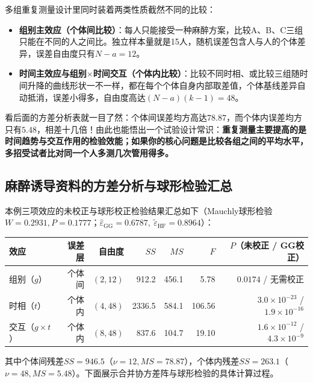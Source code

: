 \begin{sikao}[为什么多组重复测量有两个误差项？]
多组重复测量设计里同时装着两类性质截然不同的比较：
\begin{itemize}
\item \textbf{组别主效应（个体间比较）}：每人只能接受一种麻醉方案，比较A、B、C三组只能在不同的人之间比。独立样本量就是15人，随机误差包含人与人的个体差异，误差自由度只有$N-a=12$。
\item \textbf{时间主效应与组别$\times$时间交互（个体内比较）}：比较不同时相、或比较三组随时间升降的曲线形状一不一样，都在每个个体自身内部取差值，个体基线差异自动抵消，误差小得多，自由度高达$(N-a)(k-1)=48$。
\end{itemize}
看后面的方差分析表就一目了然：个体间误差均方高达$78.87$，而个体内误差均方只有$5.48$，相差十几倍！由此也能悟出一个试验设计常识：\textbf{重复测量主要提高的是时间趋势与交互作用的检验效能；如果你的核心问题是比较各组之间的平均水平，多招受试者比对同一个人多测几次管用得多。}
\end{sikao}

\subsection{麻醉诱导资料的方差分析与球形检验汇总}
本例三项效应的未校正与球形校正检验结果汇总如下（Mauchly球形检验$W=0.2931,P=0.1777$；$\widehat\varepsilon_{\mathrm{GG}}=0.6787,\ \widetilde\varepsilon_{\mathrm{HF}}=0.8964$）：
\begin{center}\small
\begin{tabular}{lrrrrrr}
\toprule 效应&误差层&自由度&$SS$&$MS$&$F$&$P$（未校正 / GG校正）\\\midrule
组别（$g$）&个体间&$(2,12)$&912.2&456.1&5.78&$0.0174$ / 无需校正\\
时相（$t$）&个体内&$(4,48)$&2336.5&584.1&106.56&$3.0\times10^{-23}$ / $1.9\times10^{-16}$\\
交互（$g\times t$）&个体内&$(8,48)$&837.6&104.7&19.10&$1.6\times10^{-12}$ / $4.3\times10^{-9}$\\\bottomrule
\end{tabular}
\end{center}
其中个体间残差$SS=946.5$（$\nu=12,MS=78.87$），个体内残差$SS=263.1$（$\nu=48,MS=5.48$）。下面展示合并协方差阵与球形检验的具体计算过程。

